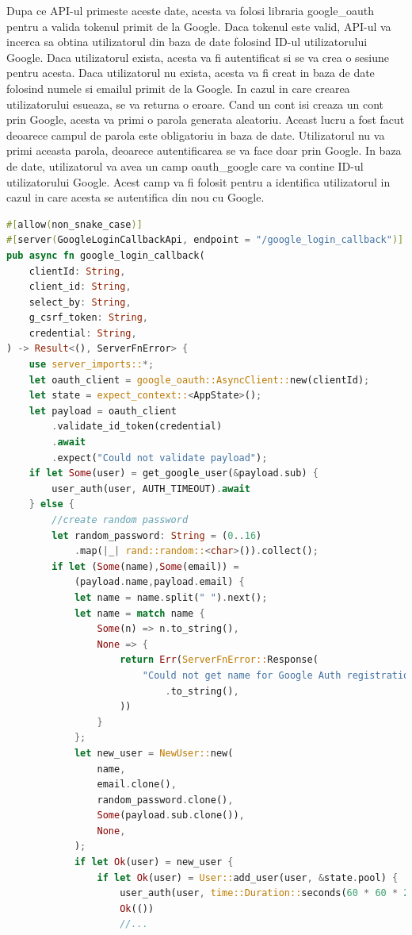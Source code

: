 \documentclass[titlepage,12pt]{article}
\DeclareRobustCommand{\code}[1]{{\ttfamily\small #1}}
\begin{document}
Dupa ce API-ul primeste aceste date, acesta va folosi libraria \code{google\_oauth} pentru a valida tokenul primit de la Google. Daca tokenul este valid, API-ul va incerca sa obtina utilizatorul din baza de date folosind ID-ul utilizatorului Google. Daca utilizatorul exista, acesta va fi autentificat si se va crea o sesiune pentru acesta. Daca utilizatorul nu exista, acesta va fi creat in baza de date folosind numele si emailul primit de la Google. In cazul in care crearea utilizatorului esueaza, se va returna o eroare.
Cand un cont isi creaza un cont prin Google, acesta va primi o parola generata aleatoriu. Aceast lucru a fost facut deoarece campul de parola este obligatoriu in baza de date. Utilizatorul nu va primi aceasta parola, deoarece autentificarea se va face doar prin Google.
In baza de date, utilizatorul va avea un camp \code{oauth\_google} care va contine ID-ul utilizatorului Google. Acest camp va fi folosit pentru a identifica utilizatorul in cazul in care acesta se autentifica din nou cu Google.
\begin{lstlisting}[language=Rust,caption={API pentru autentificarea cu Google},label={lst:googleloginapi}]
#[allow(non_snake_case)]
#[server(GoogleLoginCallbackApi, endpoint = "/google_login_callback")]
pub async fn google_login_callback(
    clientId: String,
    client_id: String,
    select_by: String,
    g_csrf_token: String,
    credential: String,
) -> Result<(), ServerFnError> {
    use server_imports::*;
    let oauth_client = google_oauth::AsyncClient::new(clientId);
    let state = expect_context::<AppState>();
    let payload = oauth_client
        .validate_id_token(credential)
        .await
        .expect("Could not validate payload");
    if let Some(user) = get_google_user(&payload.sub) {
        user_auth(user, AUTH_TIMEOUT).await
    } else {
        //create random password
        let random_password: String = (0..16)
            .map(|_| rand::random::<char>()).collect();
        if let (Some(name),Some(email)) =
            (payload.name,payload.email) {
            let name = name.split(" ").next();
            let name = match name {
                Some(n) => n.to_string(),
                None => {
                    return Err(ServerFnError::Response(
                        "Could not get name for Google Auth registration"
                            .to_string(),
                    ))
                }
            };
            let new_user = NewUser::new(
                name,
                email.clone(),
                random_password.clone(),
                Some(payload.sub.clone()),
                None,
            );
            if let Ok(user) = new_user {
                if let Ok(user) = User::add_user(user, &state.pool) {
                    user_auth(user, time::Duration::seconds(60 * 60 * 24)).await?;
                    Ok(())
                    //...
\end{lstlisting}
\end{document}
